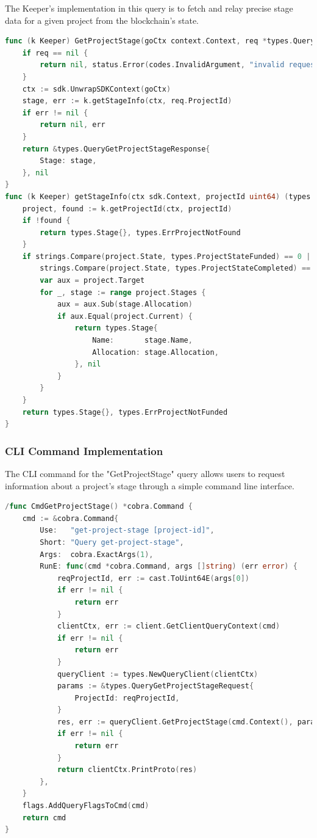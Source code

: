 The Keeper's implementation in this query is to fetch and relay precise stage data for a given project from the blockchain's state.

\begin{lstlisting}[language=go, caption={Keeper Implementation for GetProjectStage Query}]
func (k Keeper) GetProjectStage(goCtx context.Context, req *types.QueryGetProjectStageRequest) (*types.QueryGetProjectStageResponse, error) {
	if req == nil {
		return nil, status.Error(codes.InvalidArgument, "invalid request")
	}
	ctx := sdk.UnwrapSDKContext(goCtx)
	stage, err := k.getStageInfo(ctx, req.ProjectId)
	if err != nil {
		return nil, err
	}
	return &types.QueryGetProjectStageResponse{
		Stage: stage,
	}, nil
}
func (k Keeper) getStageInfo(ctx sdk.Context, projectId uint64) (types.Stage, error) {
	project, found := k.getProjectId(ctx, projectId)
	if !found {
		return types.Stage{}, types.ErrProjectNotFound
	}
	if strings.Compare(project.State, types.ProjectStateFunded) == 0 ||
		strings.Compare(project.State, types.ProjectStateCompleted) == 0 {
		var aux = project.Target
		for _, stage := range project.Stages {
			aux = aux.Sub(stage.Allocation)
			if aux.Equal(project.Current) {
				return types.Stage{
					Name:       stage.Name,
					Allocation: stage.Allocation,
				}, nil
			}
		}
	}
	return types.Stage{}, types.ErrProjectNotFunded
}
\end{lstlisting}

\subsubsection{CLI Command Implementation}

The CLI command for the "GetProjectStage" query allows users to request information about a project's stage through a simple command line interface.


\begin{lstlisting}[language=go, caption={CLI Command Implementation for GetProjectStage Query}]
/func CmdGetProjectStage() *cobra.Command {
	cmd := &cobra.Command{
		Use:   "get-project-stage [project-id]",
		Short: "Query get-project-stage",
		Args:  cobra.ExactArgs(1),
		RunE: func(cmd *cobra.Command, args []string) (err error) {
			reqProjectId, err := cast.ToUint64E(args[0])
			if err != nil {
				return err
			}
			clientCtx, err := client.GetClientQueryContext(cmd)
			if err != nil {
				return err
			}
			queryClient := types.NewQueryClient(clientCtx)
			params := &types.QueryGetProjectStageRequest{
				ProjectId: reqProjectId,
			}
			res, err := queryClient.GetProjectStage(cmd.Context(), params)
			if err != nil {
				return err
			}
			return clientCtx.PrintProto(res)
		},
	}
	flags.AddQueryFlagsToCmd(cmd)
	return cmd
}
\end{lstlisting}

